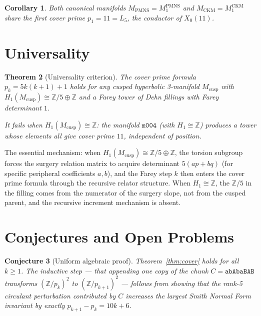 \documentclass[11pt,a4paper]{article}
\newtheorem{theorem}{Theorem}[section]
\newtheorem{corollary}[theorem]{Corollary}
\newtheorem{conjecture}[theorem]{Conjecture}
\theoremstyle{definition}
\newcommand{\ZZ}{\mathbb{Z}}
\newcommand{\MPMNS}{M_{\mathrm{PMNS}}}
\newcommand{\MCKM}{M_{\mathrm{CKM}}}
\newcommand{\pk}{p_k}
\newcommand{\Xo}{X_0(11)}
\begin{document}
\begin{corollary}
Both canonical manifolds $\MPMNS = M_1^{\mathrm{PMNS}}$ and
$\MCKM = M_1^{\mathrm{CKM}}$ share the first cover prime
$p_1 = 11 = L_5$, the conductor of $\Xo$.
\end{corollary}

\section{Universality}
\label{sec:universality}

\begin{theorem}[Universality criterion]
\label{thm:universality}
The cover prime formula $\pk = 5k(k+1)+1$ holds for any
cusped hyperbolic 3-manifold $M_{\mathrm{cusp}}$ with
$H_1(M_{\mathrm{cusp}}) \cong \ZZ/5 \oplus \ZZ$ and
a Farey tower of Dehn fillings with Farey determinant $1$.

It fails when $H_1(M_{\mathrm{cusp}}) \cong \ZZ$:
the manifold $\texttt{m004}$ (with $H_1 \cong \ZZ$)
produces a tower whose elements all give cover prime $11$,
independent of position.
\end{theorem}

The essential mechanism: when $H_1(M_{\mathrm{cusp}}) \cong \ZZ/5 \oplus \ZZ$,
the torsion subgroup forces the surgery relation matrix to acquire
determinant $5(ap+bq)$ (for specific peripheral coefficients $a,b$),
and the Farey step $k$ then enters the cover prime formula through
the recursive relator structure.
When $H_1 \cong \ZZ$, the $\ZZ/5$ in the filling comes from the
numerator of the surgery slope, not from the cusped parent,
and the recursive increment mechanism is absent.

\section{Conjectures and Open Problems}
\label{sec:conjectures}

\begin{conjecture}[Uniform algebraic proof]
\label{conj:induction}
Theorem~\ref{thm:cover} holds for all $k \geq 1$.
The inductive step --- that appending one copy of the chunk
$C = \texttt{abAbaBAB}$ transforms $(\ZZ/\pk)^2$
to $(\ZZ/p_{k+1})^2$ --- follows from showing that the
rank-5 circulant perturbation contributed by $C$ increases
the largest Smith Normal Form invariant by exactly $p_{k+1}-\pk = 10k+6$.
\end{conjecture}
\end{document}

